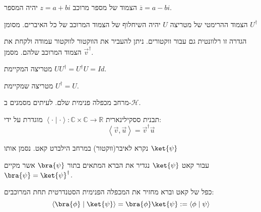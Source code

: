 \documentclass{tstextbook}
\begin{document}
\begin{definition}
הצמוד של מספר מרוכב \(z=a+bi\) יהיה המספר \(\overline{z}=a-bi\).

\end{definition}
\begin{definition}
הצמוד ההרימטי של מטריצה \(U\) יהיה השיחלוף של הצמוד המרוכב של כל האיברים. מסומן \(U^{\dagger}\)

\end{definition}
\begin{remark}
הגדרה זו רלוונטית גם עבור ווקטורים. ניתן להעביר את הווקטור לווקטור עמודה ולקחת את הצמוד המרוכב שלהם. מסמן \(\vec{v}^{\dagger}\).

\end{remark}
\begin{definition}
מטריצה המקיימת \(U U^{\dagger}=U^{\dagger} U=Id\).

\end{definition}
\begin{definition}
מטריצה שמקיימת \(U^{\dagger}=U\).

\end{definition}
\begin{definition}
מרחב מכפלה פנימית שלם. לעיתים מסמנים ב-\(\mathcal{H}\).

\end{definition}
\begin{definition}
תבנית ססקילינארית \(\left\langle  \cdot \mid\cdot  \right\rangle:\mathbb{C}\times \mathbb{C}\to \mathbb{R}\) מוגדרת על ידי:
$$\left\langle  \vec{v},\vec{u}  \right\rangle ={\vec{v}}^{\dagger} \vec{u}$$

\end{definition}
\begin{definition}[קאט]
נקרא לאיבר(ווקטור) במרחב הילברט קאט. נסמן אותו \(\ket{\psi}\)

\end{definition}
\begin{definition}[ברא]
עבור קאט \(\ket{\psi}\) נגדיר את הברא המתאים בתור \(\bra{\psi}\) אשר מקיים \(\bra{\psi}=\ket{\psi}^{\dagger}\).

\end{definition}
\begin{proposition}
כפל של קאט וברא מחזיר את המכפלה הפנימית הסטנדרטית תחת המרוכבים:
$$\left\langle  \bra{\phi} \mid \ket{\psi}   \right\rangle =\bra{\phi}\ket{\psi} :=\left\langle  \phi \mid \psi  \right\rangle  $$

\end{proposition}
\end{document}
